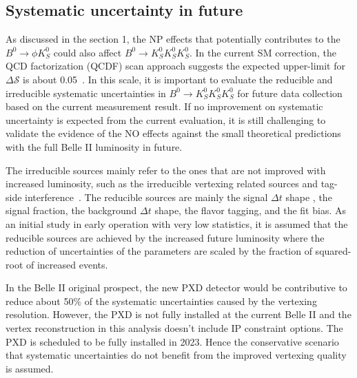 \subsection{Systematic uncertainty in future}
As discussed in the section 1, the NP effects that potentially contributes to the $B^0\to \phi K_S^0$ could also affect $B^0 \to K_S^0  K_S^0  K_S^0$. In the current SM correction, the QCD factorization (QCDF) scan approach suggests the expected upper-limit for $\Delta \mathcal{S}$ is about 0.05~\cite{b2book}. In this scale, it is important to evaluate the reducible and irreducible systematic uncertainties in $B^0 \to K_S^0  K_S^0  K_S^0$ for future data collection based on the current measurement result. If no improvement on systematic uncertainty is expected from the current evaluation, it is still challenging to validate the evidence of the NO effects against the small theoretical predictions with the full Belle II luminosity in future.

The irreducible sources mainly refer to the ones that are not improved with increased luminosity, such as the irreducible vertexing related sources and tag-side interference~\cite{b2book}. The reducible sources are mainly the signal $\Delta t$ shape , the signal fraction, the background $\Delta t$ shape, the flavor tagging, and the fit bias. As an initial study in early operation with very low statistics, it is assumed that the reducible sources are achieved by the increased future luminosity where the reduction of uncertainties of the parameters are scaled by the fraction of squared-root of increased events.

In the Belle II original prospect, the new PXD detector would be contributive to reduce about 50\% of the systematic uncertainties caused by the vertexing resolution. However, the PXD is not fully installed at the current Belle II  and the vertex reconstruction in this analysis doesn't include IP constraint options. The PXD is scheduled to be fully installed in 2023. Hence the conservative scenario that systematic uncertainties do not benefit from the improved vertexing quality is assumed.

